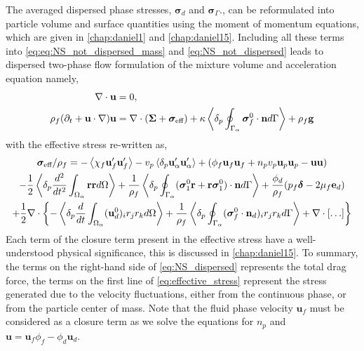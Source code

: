 The averaged dispersed phase stresses, $\bm\sigma_d$ and $\bm\sigma_\Gamma.$, can be reformulated into particle volume and surface quantities using the moment of momentum equations, which are given in \ref{chap:daniel1} and \ref{chap:daniel15}. 
Including all these terms into \ref{eq:eq:NS_not_dispersed_mass} and \ref{eq:NS_not_dispersed} leads to dispersed two-phase flow formulation of the mixture volume and acceleration equation namely, 
\begin{align}
    \div\textbf{u}&=0, \\
    \rho_f (\pddt 
    + \textbf{u}\cdot \grad)
    \textbf{u}
    &= 
    \div (\bm\Sigma +  \bm{\sigma}_\text{eff} )
    + \kappa \pSavg{ \bm{\sigma}_f^0 \cdot \textbf{n}} 
    + \rho_f\textbf{g} 
    \label{eq:NS_dispersed}
\end{align}
with the effective stress re-written as, 
\begin{multline}
    \bm\sigma_\text{eff}/\rho_f = 
    - \avg{ \chi_f \textbf{u}_f'\textbf{u}_f'}
    - v_p \pavg{ \textbf{u}_\alpha'\textbf{u}_\alpha'}
    + (\phi_f \textbf{u}_f \textbf{u}_f
        +n_pv_p\textbf{u}_p \textbf{u}_p
        - \textbf{uu} 
    )\\
    -\frac{1}{2}\pavg{\frac{d^2 }{dt^2}\intO{\textbf{rr}}}
    +\frac{1}{\rho_f}\pSavg{ 
        (\bm{\sigma}_1^0 \textbf{r}
        + \textbf{r}\bm{\sigma}_1^0 )
        \cdot \textbf{n}
    }
    + \frac{\phi_d}{\rho_f} (p_f\bm\delta -2\mu_f \textbf{e}_d)
    \\
    +\frac{1}{2}\div\left\{
    - \pavg{\ddt\intO{  (\textbf{u}_d^0)_i r_j r_k }}
    +\frac{1}{\rho_f}\pSavg{  (\bm{\sigma}_f^0 \cdot \textbf{n}_d)_i r_{j}  r_{k}  } 
    + \div[\ldots]
    \right\}
    \label{eq:effective_stress}
\end{multline}
Each term of the closure term present in the effective stress have a well-understood physical significance, this is discussed in \ref{chap:daniel15}.
To summary, the terms on the right-hand side of \ref{eq:NS_dispersed} represents the total drag force, the terms on the first line of \ref{eq:effective_stress} represent the stress generated due to the velocity fluctuations, either from the continuous phase, or from the particle center of mass. 
Note that the fluid phase velocity $\textbf{u}_f$ must be considered as a closure term as we solve the equations for $n_p$ and  $\textbf{u} = \textbf{u}_f \phi_f - \phi_d \textbf{u}_d$.
